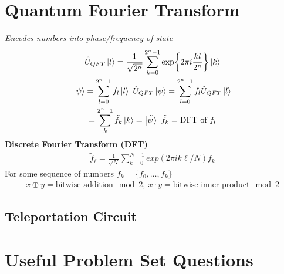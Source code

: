 \documentclass[10pt, a4paper, reprint, amsmath,amssymb, aps]{revtex4-2}
\begin{document}
\section{Quantum Fourier Transform}
    \textit{Encodes numbers into phase/frequency of state}
    \begin{gather*}
        \hat{U}_{QFT}\ket{l} = \frac{1}{\sqrt{2^n}}\sum\limits_{k=0}^{2^n-1}\exp{2\pi i\frac{kl}{2^n}}\ket{k} \\
        \ket{\psi} = \sum_{l=0}^{2^n-1}f_l\ket{l} \ \hat{U}_{QFT}\ket{\psi} = \sum_{l=0}^{2^n-1}f_l\hat{U}_{QFT}\ket{l} \\
        = \sum_{k}^{2^n-1}\tilde{f}_{k}\ket{k} = \ket{\tilde{\psi}} \ \tilde{f}_k = \text{DFT of} \ f_l
    \end{gather*}
    \textbf{Discrete Fourier Transform (DFT)}
    \begin{gather*}
        \tilde{f}_\ell = \frac{1}{\sqrt{N}} \sum_{k=0}^{N-1} exp(2\pi i k \ell / N) f_k
    \end{gather*}
    For some sequence of numbers $f_k = \{f_0, \dots, f_k\}$
    \begin{gather*}
    x\oplus y = \text{bitwise addition} \mod 2, \ x\cdot y = \text{bitwise inner product} \mod 2
    \end{gather*}

    \subsection{Teleportation Circuit}
      
        \begin{center}
        \end{center}
    
\section{Useful Problem Set Questions}
    \vspace{-0.5cm}
\end{document}
